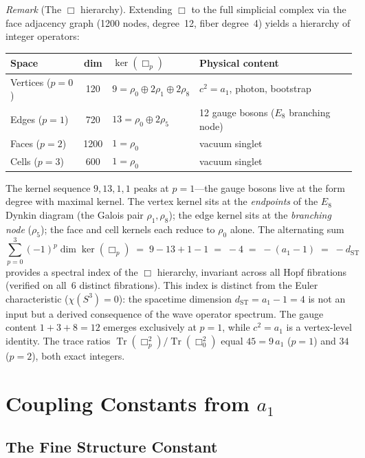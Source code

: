 \documentclass[12pt,a4paper]{article}
\theoremstyle{definition}
\begin{document}
\noindent\textit{Remark} (The $\Box$ hierarchy).  Extending $\Box$ to the full simplicial complex via the face adjacency graph (1200 nodes, degree~12, fiber degree~4) yields a hierarchy of integer operators:
\begin{center}\small
\begin{tabular}{lcll}
\toprule
\textbf{Space} & \textbf{dim} & \textbf{$\ker(\Box_p)$} & \textbf{Physical content}\\
\midrule
Vertices ($p=0$) & 120 & $9 = \rho_0 \oplus 2\rho_1 \oplus 2\rho_8$ & $c^2 = a_1$, photon, bootstrap \\
Edges ($p=1$) & 720 & $13 = \rho_0 \oplus 2\rho_5$ & 12 gauge bosons ($E_8$ branching node) \\
Faces ($p=2$) & 1200 & $1 = \rho_0$ & vacuum singlet \\
Cells ($p=3$) & 600 & $1 = \rho_0$ & vacuum singlet \\
\bottomrule
\end{tabular}
\end{center}
The kernel sequence $9, 13, 1, 1$ peaks at $p = 1$---the gauge bosons live at the form degree with maximal kernel.  The vertex kernel sits at the \emph{endpoints} of the $E_8$ Dynkin diagram (the Galois pair $\rho_1, \rho_8$); the edge kernel sits at the \emph{branching node} ($\rho_5$); the face and cell kernels each reduce to $\rho_0$ alone.  The alternating sum
\[
\boxed{\sum_{p=0}^{3} (-1)^p \dim\ker(\Box_p) \;=\; 9 - 13 + 1 - 1 \;=\; -4 \;=\; -(a_1 - 1) \;=\; -d_{\mathrm{ST}}}
\]
provides a spectral index of the $\Box$ hierarchy, invariant across all Hopf fibrations (verified on all~6 distinct fibrations).  This index is distinct from the Euler characteristic ($\chi(S^3) = 0$): the spacetime dimension $d_{\mathrm{ST}} = a_1 - 1 = 4$ is not an input but a derived consequence of the wave operator spectrum.  The gauge content $1 + 3 + 8 = 12$ emerges exclusively at $p = 1$, while $c^2 = a_1$ is a vertex-level identity.  The trace ratios $\operatorname{Tr}(\Box_p^2)/\operatorname{Tr}(\Box_0^2)$ equal $45 = 9\,a_1$ ($p=1$) and $34$ ($p=2$), both exact integers.


\section{Coupling Constants from \texorpdfstring{$a_1$}{a1}}
\label{sec:coupling}

\subsection{The Fine Structure Constant}
\end{document}

